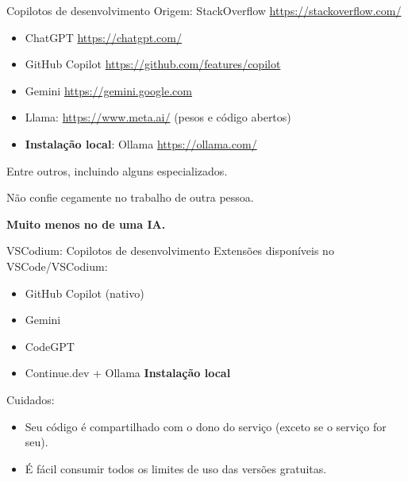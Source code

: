 \documentclass{beamer}
\begin{document}
\begin{frame}{Copilotos de desenvolvimento}
    Origem: StackOverflow \url{https://stackoverflow.com/}
    
    \begin{itemize}
        
        \item ChatGPT \url{https://chatgpt.com/}
        \item GitHub Copilot \url{https://github.com/features/copilot}
        \item Gemini \url{https://gemini.google.com}
        \item Llama: \url{https://www.meta.ai/} (pesos e código abertos)
        \item \textbf{Instalação local}: Ollama \url{https://ollama.com/} 
    \end{itemize}
    Entre outros, incluindo alguns especializados.
    
    \espaco
    Não confie cegamente no trabalho de outra pessoa.  
    
    \espaco
    \centering
    \textbf{\Large{Muito menos no de uma IA.}}
\end{frame}

\begin{frame}{VSCodium: Copilotos de desenvolvimento}
    Extensões disponíveis no VSCode/VSCodium:
    \begin{itemize}
        \item GitHub Copilot (nativo)
        \item Gemini
        \item CodeGPT
        \item Continue.dev + Ollama \textbf{Instalação local}     
    \end{itemize}
    \espaco
    Cuidados:
    \begin{itemize}
        \item Seu código é compartilhado com o dono do serviço (exceto se o serviço for seu).
        \item É fácil consumir todos os limites de uso das versões gratuitas.
    \end{itemize}
\end{frame}
\end{document}

